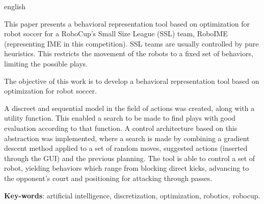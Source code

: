 \begin{resumo}[Abstract]\begin{otherlanguage*}{english}

  This paper presents a behavioral representation tool based on optimization for
  robot soccer for a RoboCup's Small Size League (SSL) team, RoboIME
  (representing IME in this competition). SSL teams are usually controlled by
  pure heuristics. This restricts the movement of the robots to a fixed set of
  behaviors, limiting the possible plays.

  The objective of this work is to develop a behavioral representation tool
  based on optimization for robot soccer.

  A discreet and sequential model in the field of actions was created, along
  with a utility function. This enabled a search to be made to find plays with
  good evaluation according to that function. A control architecture based on
  this abstraction was implemented, where a search is made by combining a
  gradient descent method applied to a set of random moves, suggested actions
  (inserted through the GUI) and the previous planning. The tool is able to
  control a set of robot, yielding behaviors which range from blocking direct
  kicks, advancing to the opponent's court and positioning for attacking through
  passes.

  \textbf{Key-words}: artificial intelligence, discretization, optimization, robotics, robocup.
\end{otherlanguage*}\end{resumo}


